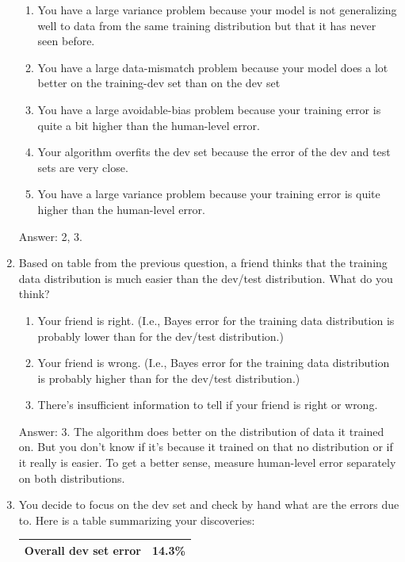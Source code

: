 \documentclass[12pt]{article}
\numberwithin{equation}{section}
\begin{document}
\begin{enumerate}
	\begin{enumerate}
		\item You have a large variance problem because your model is not generalizing well to data from the same training distribution but that it has never seen before.
		\item You have a large data-mismatch problem because your model does a lot better on the training-dev set than on the dev set
		\item You have a large avoidable-bias problem because your training error is quite a bit higher than the human-level error.
		\item Your algorithm overfits the dev set because the error of the dev and test sets are very close.
		\item You have a large variance problem because your training error is quite higher than the human-level error.
	\end{enumerate} \par
	Answer: 2, 3.
	\item Based on table from the previous question, a friend thinks that the training data distribution is much easier than the dev/test distribution. What do you think?
	\begin{enumerate}
		\item Your friend is right. (I.e., Bayes error for the training data distribution is probably lower than for the dev/test distribution.)
		\item Your friend is wrong. (I.e., Bayes error for the training data distribution is probably higher than for the dev/test distribution.)
		\item There's insufficient information to tell if your friend is right or wrong.
	\end{enumerate}\par
	Answer: 3. The algorithm does better on the distribution of data it trained on. But you don't know if it's because it trained on that no distribution or if it really is easier. To get a better sense, measure human-level error separately on both distributions.\par
	\item You decide to focus on the dev set and check by hand what are the errors due to. Here is a table summarizing your discoveries: \par
	\begin{table}[H]
  		\centering
  		\begin{tabular}{l|c}
   			Overall dev set error & 14.3\%\\ \hline

\end{tabular}
\end{table}
\end{enumerate}
\end{document}

